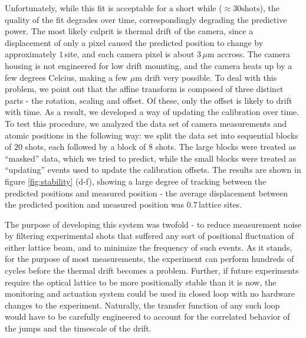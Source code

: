 \documentclass[twocolumn,aps,pra,showpacs,preprintnumbers,bibnotes]{revtex4-1}
\begin{document}
Unfortunately, while this fit is acceptable for a short while ($\approx30\mathrm{ shots}$), the quality of the fit degrades over time, correspondingly degrading the predictive power. 
The most likely culprit is thermal drift of the camera, since a displacement of only a pixel caused the predicted position to change by approximately $1\,$site, and each camera pixel is about $3\,\mu$m accross. 
The camera housing is not engineered for low drift mounting, and the camera heats up by a few degrees Celcius, making a few $\mu$m drift very possible.
To deal with this problem, we point out that the affine transform is composed of three distinct parts - the rotation, scaling and offset. 
Of these, only the offset is likely to drift with time.
As a result, we developed a way of updating the calibration over time. To test this procedure, we analyzed the data set of camera measurements and atomic positions in the following way: we split the data set into sequential blocks of $20$ shots, each followed by a block of $8$ shots. 
The large blocks were treated as ``masked'' data, which we tried to predict, while the small blocks were treated as ``updating'' events used to update the calibration offsets.
The results are shown in figure \ref{fig:stability} (d-f), showing a large degree of tracking between the predicted positions and measured position - the average displacement between the predicted position and measured position was $0.7\,$lattice sites. 

The purpose of developing this system was twofold - to reduce measurement noise by filtering experimental shots that suffered any sort of positional fluctuation of either lattice beam, and to minimize the frequency of such events. As it stands, for the purpose of most measurements, the experiment can perform hundreds of cycles before the thermal drift becomes a problem.
Further, if future experiments require the optical lattice to be more positionally stable than it is now, the monitoring and actuation system could be used in closed loop with no hardware changes to the experiment.
Naturally, the transfer function of any such loop would have to be carefully engineered to account for the correlated behavior of the jumps and the timescale of the drift.
\end{document}
